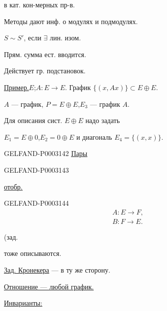 в кат. кон-мерных пр-в.

Методы дают инф. о модулях и подмодулях.

$S\sim S'$, если $\exists$ лин. изом.

Прям. сумма ест. вводится.

Действует гр. подстановок.

\underline{Пример.}\qquad $E$;\quad $A:E\to E$. График $\{(x,Ax)\}\subset E\oplus E$.

$A$ --- график, $P=E\oplus E$,\quad $E_3$ --- график $A$.

Для описания сист. $E\oplus E$ надо задать

$E_1=E\oplus0$,\quad $E_2=0\oplus E$ и диагональ $E_4=\{(x,x)\}$.

\begin{GelfandAdjacentEvidence}{GELFAND-P000314}{2}
\underline{\underline{Пары}}

\end{GelfandAdjacentEvidence}
\begin{GelfandAdjacentEvidence}{GELFAND-P000314}{3}


\end{GelfandAdjacentEvidence}


\underline{\underline{отобр.}}

\begin{GelfandAdjacentEvidence}{GELFAND-P000314}{4}
\begin{gather*}A:E\longrightarrow F,\\B:F\longrightarrow E.\end{gather*}

\end{GelfandAdjacentEvidence}


\hfill(зад.

тоже описываются.

\uline{Зад. Кронекера} --- в ту же сторону.

\uline{Отношение --- любой график.}

\uline{Инварианты:}

